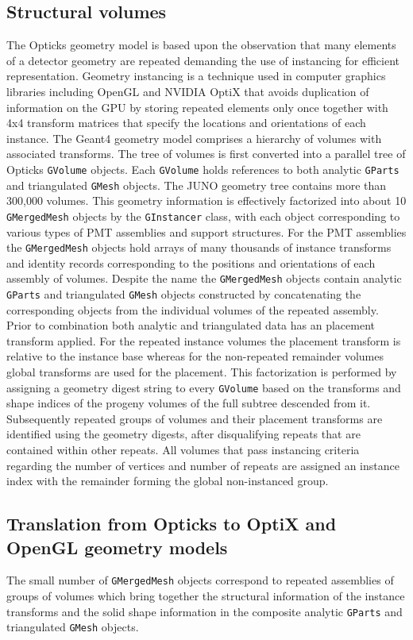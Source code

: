 \documentclass{webofc}
\begin{document}
\subsection{Structural volumes}%
%
The Opticks geometry model is based upon the observation that many elements of a detector 
geometry are repeated demanding the use of instancing for efficient representation.  
Geometry instancing is a technique used in computer graphics libraries including OpenGL and NVIDIA OptiX that avoids 
duplication of information on the GPU by storing repeated elements only once together with 4x4 transform matrices 
that specify the locations and orientations of each instance.
%
The Geant4 geometry model comprises a hierarchy of volumes with associated transforms.
The tree of volumes is first converted into a parallel tree of Opticks {\tt GVolume} objects.
Each {\tt GVolume} holds references to both analytic {\tt GParts} and triangulated {\tt GMesh} objects.
The JUNO geometry tree contains more than 300,000 volumes.  This geometry information 
is effectively factorized into about 10 {\tt GMergedMesh} objects by the {\tt GInstancer} class, with
each object corresponding to various types of PMT assemblies and support structures. 
For the PMT assemblies the {\tt GMergedMesh} objects hold arrays of many thousands of instance transforms 
and identity records corresponding to the positions and orientations of each assembly of volumes.
Despite the name the {\tt GMergedMesh} objects contain analytic {\tt GParts} and triangulated {\tt GMesh}
objects constructed by concatenating the corresponding objects from the individual volumes
of the repeated assembly. Prior to combination both analytic and triangulated data has an 
placement transform applied. For the repeated instance volumes the placement 
transform is relative to the instance base whereas for the non-repeated remainder volumes global 
transforms are used for the placement.
%
This factorization is performed by assigning a geometry digest string to every {\tt GVolume} based on the transforms and shape indices of the progeny 
volumes of the full subtree descended from it. Subsequently repeated groups of volumes and their placement transforms are 
identified using the geometry digests, after disqualifying repeats that are contained within other repeats. 
All volumes that pass instancing criteria regarding the number of vertices and number of repeats are assigned an instance index
with the remainder forming the global non-instanced group. 
%
\subsection{Translation from Opticks to OptiX and OpenGL geometry models}%
%
The small number of {\tt GMergedMesh} objects correspond to repeated assemblies of groups of volumes
which bring together the structural information of the instance transforms and the solid shape information 
in the composite analytic {\tt GParts} and triangulated {\tt GMesh} objects.
\end{document}
